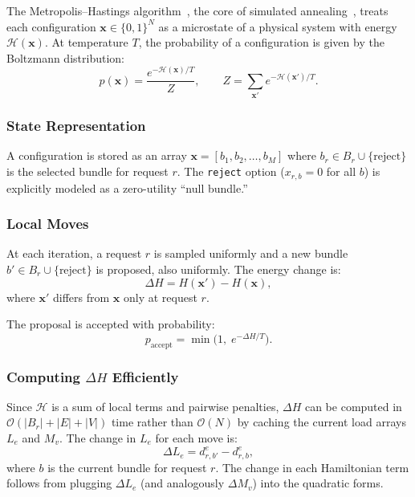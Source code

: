 \documentclass[10pt,a4paper]{article}
\newcommand{\calH}{\mathcal{H}}
\begin{document}
The Metropolis--Hastings algorithm~\cite{metropolis1953equation}, the
core of simulated annealing~\cite{kirkpatrick1983optimization}, treats
each configuration $\mathbf{x} \in \{0,1\}^N$ as a microstate of a
physical system with energy $\calH(\mathbf{x})$.  At temperature $T$,
the probability of a configuration is given by the Boltzmann
distribution:
\begin{equation}
  p(\mathbf{x}) = \frac{e^{-\calH(\mathbf{x})/T}}{Z},
  \qquad Z = \sum_{\mathbf{x}'} e^{-\calH(\mathbf{x}')/T}.
\end{equation}

\subsubsection{State Representation}

A configuration is stored as an array
$\mathbf{x} = [b_1, b_2, \dots, b_M]$ where $b_r \in
B_r \cup \{\text{reject}\}$ is the selected bundle for request $r$.
The \texttt{reject} option ($x_{r,b}=0$ for all $b$) is explicitly
modeled as a zero-utility ``null bundle.''

\subsubsection{Local Moves}

At each iteration, a request $r$ is sampled uniformly and a new
bundle $b' \in B_r \cup \{\text{reject}\}$ is proposed, also
uniformly.  The energy change is:
\begin{equation}
  \Delta H = H(\mathbf{x}') - H(\mathbf{x}),
\end{equation}
where $\mathbf{x}'$ differs from $\mathbf{x}$ only at request $r$.

The proposal is accepted with probability:
\begin{equation}
  p_{\text{accept}} = \min\!\bigl(1,\; e^{-\Delta H / T}\bigr).
\label{eq:metropolis-accept}
\end{equation}

\subsubsection{Computing $\Delta H$ Efficiently}

Since $\calH$ is a sum of local terms and pairwise penalties, $\Delta H$
can be computed in $\mathcal{O}(|B_r| + |E| + |V|)$ time rather than
$\mathcal{O}(N)$ by caching the current load arrays $L_e$ and $M_v$.
The change in $L_e$ for each move is:
\begin{equation}
  \Delta L_e = d_{r,b'}^e - d_{r,b}^e,
\end{equation}
where $b$ is the current bundle for request $r$.  The change in each
Hamiltonian term follows from plugging $\Delta L_e$ (and analogously
$\Delta M_v$) into the quadratic forms.
\end{document}
